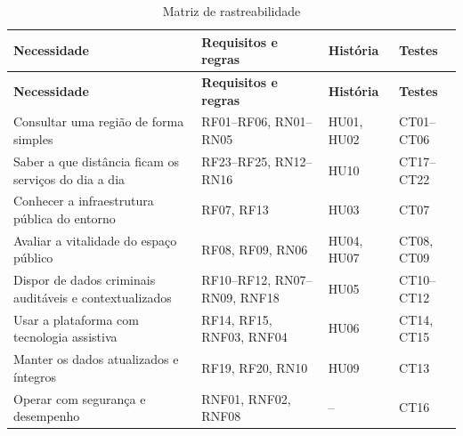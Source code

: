 \begin{longtable}{L{4.8cm}L{4.2cm}C{2.0cm}C{2.6cm}}
	\caption{Matriz de rastreabilidade}
	\label{qua:rastreab}                                                                                                          \\
	\toprule
	\textbf{Necessidade}                                    & \textbf{Requisitos e regras}  & \textbf{História} & \textbf{Testes} \\
	\midrule
	\endfirsthead
	\toprule
	\textbf{Necessidade}                                    & \textbf{Requisitos e regras}  & \textbf{História} & \textbf{Testes} \\
	\midrule
	\endhead
	\bottomrule
	\endfoot
	Consultar uma região de forma simples                   & RF01--RF06, RN01--RN05        & HU01, HU02        & CT01--CT06      \\
	Saber a que distância ficam os serviços do dia a dia    & RF23--RF25, RN12--RN16        & HU10              & CT17--CT22      \\
	Conhecer a infraestrutura pública do entorno            & RF07, RF13                    & HU03              & CT07            \\
	Avaliar a vitalidade do espaço público                  & RF08, RF09, RN06              & HU04, HU07        & CT08, CT09      \\
	Dispor de dados criminais auditáveis e contextualizados & RF10--RF12, RN07--RN09, RNF18 & HU05              & CT10--CT12      \\
	Usar a plataforma com tecnologia assistiva              & RF14, RF15, RNF03, RNF04      & HU06              & CT14, CT15      \\
	Manter os dados atualizados e íntegros                  & RF19, RF20, RN10              & HU09              & CT13            \\
	Operar com segurança e desempenho                       & RNF01, RNF02, RNF08           & --                & CT16            \\
\end{longtable}
\vspace{-0.4cm}
